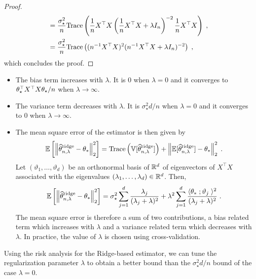 \begin{proof}
\begin{align*}
&= \frac{\sigma_\star^{2}}{n}\mathrm{Trace}\left(\frac{1}{n}X^\top X\left(\frac{1}{n}X^\top X + \lambda I_n\right)^{-2}\frac{1}{n}X^\top X\right)\;,\\
&= \frac{\sigma_\star^{2}}{n}\mathrm{Trace}\left((n^{-1}X^\top X)^2(n^{-1}X^\top X + \lambda I_n)^{-2}\right)\;,
\end{align*}
which concludes the proof.
\end{proof}
\begin{remark}
\begin{itemize}
\item The bias term increases with $\lambda$. It is 0 when $\lambda = 0$ and it converges to $\theta_\star^\top X^\top X\theta_\star / n$ when $\lambda\to \infty$.
\item  The variance term decreases with $\lambda$. It is $\sigma_\star^2 d /n$ when $\lambda = 0$ and it converges to $0$ when $\lambda\to \infty$.
\item The mean square error of the estimator is then given by
\[
\mathbb{E}\left[\left\|\widehat {\theta}^{\mathrm{ridge}}_{n,\lambda}-\theta_*\right\|_2^2\right] = \mathrm{Trace}\left(\mathbb{V}[\widehat {\theta}^{\mathrm{ridge}}_{n,\lambda}]\right) + \left\|\mathbb{E}[\widehat {\theta}^{\mathrm{ridge}}_{n,\lambda}] - \theta_*\right\|_2^2\;.
\]
Let $(\vartheta_1,\ldots,\vartheta_d)$ be an orthonormal basis of $\mathbb{R}^d$ of eigenvectors of $X^\top X$ associated with the eigenvalues $(\lambda_1,\ldots,\lambda_d)\in\mathbb{R}^d$. Then,
\[
\mathbb{E}\left[\left\|\widehat {\theta}^{\mathrm{ridge}}_{n,\lambda}-\theta_*\right\|_2^2\right] =  \sigma_\star^2 \sum_{j=1}^d \frac{\lambda_j}{(\lambda_j+\lambda)^2} + \lambda^2  \sum_{j=1}^d \frac{\langle \theta_* \;; \vartheta_j\;\rangle^2}{(\lambda_j+\lambda)^2}\;.
\]
The mean square error is therefore a sum of two contributions, a bias related term which increases with $\lambda$ and a variance related term which decreases with $\lambda$. In practice, the value of $\lambda$ is chosen using cross-validation.
\end{itemize}
\end{remark}
Using the risk analysis for the Ridge-based estimator, we can tune the regularization parameter $\lambda$ to obtain
a  better bound than the $\sigma_\star^2 d /n$ bound of the case $\lambda = 0$.

